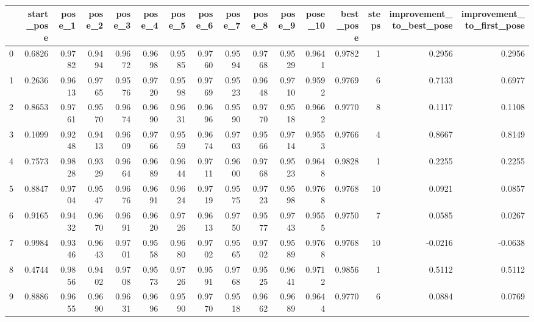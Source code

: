 \begin{tabular}{lrrrrrrrrrrrrrrr}
\toprule
{} &  start\_pose &  pose\_1 &  pose\_2 &  pose\_3 &  pose\_4 &  pose\_5 &  pose\_6 &  pose\_7 &  pose\_8 &  pose\_9 &  pose\_10 &  best\_pose &  steps &  improvement\_to\_best\_pose &  improvement\_to\_first\_pose \\
\midrule
0   &      0.6826 &  0.9782 &  0.9494 &  0.9672 &  0.9698 &  0.9585 &  0.9760 &  0.9594 &  0.9768 &  0.9529 &   0.9641 &     0.9782 &      1 &                    0.2956 &                     0.2956 \\
1   &      0.2636 &  0.9613 &  0.9765 &  0.9576 &  0.9720 &  0.9598 &  0.9769 &  0.9523 &  0.9648 &  0.9710 &   0.9592 &     0.9769 &      6 &                    0.7133 &                     0.6977 \\
2   &      0.8653 &  0.9761 &  0.9570 &  0.9674 &  0.9690 &  0.9631 &  0.9696 &  0.9590 &  0.9770 &  0.9518 &   0.9662 &     0.9770 &      8 &                    0.1117 &                     0.1108 \\
3   &      0.1099 &  0.9248 &  0.9413 &  0.9609 &  0.9766 &  0.9559 &  0.9674 &  0.9703 &  0.9566 &  0.9714 &   0.9553 &     0.9766 &      4 &                    0.8667 &                     0.8149 \\
4   &      0.7573 &  0.9828 &  0.9329 &  0.9664 &  0.9689 &  0.9644 &  0.9711 &  0.9600 &  0.9768 &  0.9523 &   0.9648 &     0.9828 &      1 &                    0.2255 &                     0.2255 \\
5   &      0.8847 &  0.9704 &  0.9547 &  0.9676 &  0.9691 &  0.9624 &  0.9719 &  0.9575 &  0.9723 &  0.9598 &   0.9768 &     0.9768 &     10 &                    0.0921 &                     0.0857 \\
6   &      0.9165 &  0.9432 &  0.9670 &  0.9691 &  0.9620 &  0.9726 &  0.9613 &  0.9750 &  0.9577 &  0.9743 &   0.9555 &     0.9750 &      7 &                    0.0585 &                     0.0267 \\
7   &      0.9984 &  0.9346 &  0.9643 &  0.9701 &  0.9558 &  0.9680 &  0.9702 &  0.9565 &  0.9702 &  0.9589 &   0.9768 &     0.9768 &     10 &                   -0.0216 &                    -0.0638 \\
8   &      0.4744 &  0.9856 &  0.9402 &  0.9708 &  0.9573 &  0.9726 &  0.9591 &  0.9768 &  0.9525 &  0.9641 &   0.9712 &     0.9856 &      1 &                    0.5112 &                     0.5112 \\
9   &      0.8886 &  0.9655 &  0.9690 &  0.9631 &  0.9696 &  0.9590 &  0.9770 &  0.9518 &  0.9662 &  0.9689 &   0.9644 &     0.9770 &      6 &                    0.0884 &                     0.0769 \\

\end{tabular}
